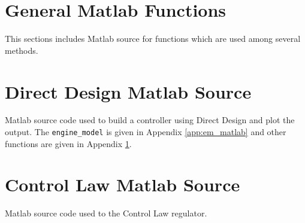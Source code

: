 \documentclass{article}
\begin{document}
\clearpage


\clearpage
\section{General Matlab Functions}
\label{app:gf_matlab}

This sections includes Matlab source for functions which are
used among several methods.





\clearpage



\clearpage
\section{Direct Design Matlab Source}
\label{app:dd_matlab}

Matlab source code used to build a controller using Direct Design
and plot the output.
The \verb+engine_model+ is given in Appendix \ref{app:em_matlab}
and other functions are given in Appendix \ref{app:gf_matlab}.



\clearpage



\clearpage
\section{Control Law Matlab Source}
\label{app:cl_matlab}

Matlab source code used to the Control Law regulator.


\end{document}
